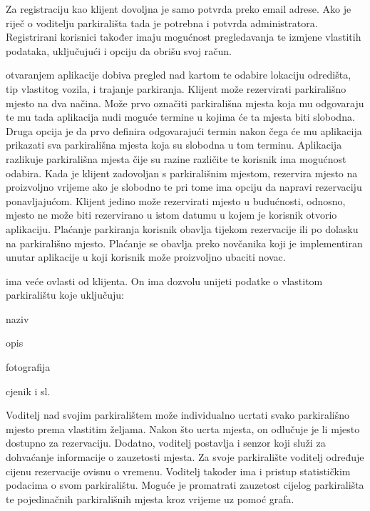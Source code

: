 		Za registraciju kao klijent dovoljna je samo potvrda preko email adrese. Ako je riječ o voditelju parkirališta tada je potrebna i potvrda administratora. Registrirani korisnici također imaju mogućnost pregledavanja te izmjene vlastitih podataka, uključujući i opciju da obrišu svoj račun.
		
		   otvaranjem aplikacije dobiva pregled nad kartom te odabire lokaciju odredišta, tip vlastitog vozila, i trajanje parkiranja. Klijent može rezervirati parkirališno mjesto na dva načina. Može prvo označiti parkirališna mjesta koja mu odgovaraju te mu tada aplikacija nudi moguće termine u kojima će ta mjesta biti slobodna. Druga opcija je da prvo definira odgovarajući termin nakon čega će mu aplikacija prikazati sva parkirališna mjesta koja su slobodna u tom terminu. Aplikacija razlikuje parkirališna mjesta čije su razine različite te korisnik ima mogućnost odabira. Kada je klijent zadovoljan s parkirališnim mjestom, rezervira mjesto na proizvoljno vrijeme ako je slobodno te pri tome ima opciju da napravi rezervaciju ponavljajućom. Klijent jedino može rezervirati mjesto u budućnosti, odnosno, mjesto ne može biti rezervirano u istom datumu u kojem je korisnik otvorio aplikaciju. Plaćanje parkiranja korisnik obavlja tijekom rezervacije ili po dolasku na parkirališno mjesto. Plaćanje se obavlja preko novčanika koji je implementiran unutar aplikacije u koji korisnik može proizvoljno ubaciti novac. 
		
		  ima veće ovlasti od klijenta. On ima dozvolu unijeti podatke o vlastitom parkiralištu koje uključuju:
		  
		  
		 
		 \begin{packed_item}
		 	\item naziv
		 	\item opis
		 	\item fotografija
		 	\item cjenik i sl.
		 \end{packed_item}
		
		\noindent Voditelj nad svojim parkiralištem može individualno ucrtati svako parkirališno mjesto prema vlastitim željama. Nakon što ucrta mjesta, on odlučuje je li mjesto dostupno za rezervaciju. Dodatno, voditelj postavlja i senzor koji služi za dohvaćanje informacije o zauzetosti mjesta. Za svoje parkiralište voditelj određuje cijenu rezervacije ovisnu o vremenu. Voditelj također ima i pristup statističkim podacima o svom parkiralištu. Moguće je promatrati zauzetost cijelog parkirališta te pojedinačnih parkirališnih mjesta kroz vrijeme uz pomoć grafa.
		

